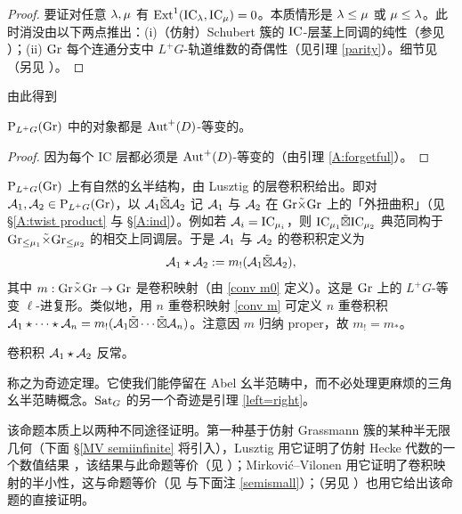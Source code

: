 \begin{proof}
要证对任意 ${\lambda},\mu$ 有 $\operatorname{Ext}^1({\operatorname{IC}}_{\lambda},{\operatorname{IC}}_\mu)=0$。本质情形是 ${\lambda}\leq \mu$ 或 $\mu\leq {\lambda}$。此时消没由以下两点推出：(i)（仿射）Schubert 簇的 $\operatorname{IC}$-层茎上同调的纯性（参见 \cite{KL}）；(ii) ${\operatorname{Gr}}$ 每个连通分支中 $L^+G$-轨道维数的奇偶性（见引理 \ref{parity}）。细节见 \cite[Proposition 1]{Ga}（另见 \cite[Proposition 3.1]{Ri}）。
\end{proof}

由此得到

\begin{cor}
$\operatorname{P}_{L^+G}({\operatorname{Gr}})$ 中的对象都是 ${\operatorname{Aut}}^+(D)$-等变的。
\end{cor}

\begin{proof}
因为每个 IC 层都必须是 ${\operatorname{Aut}}^+(D)$-等变的（由引理 \ref{A:forgetful}）。
\end{proof}

$\operatorname{P}_{L^+G}({\operatorname{Gr}})$ 上有自然的幺半结构，由 Lusztig 的层卷积积给出。即对 ${\mathcal A}_1,{\mathcal A}_2\in \operatorname{P}_{L^+G}({\operatorname{Gr}})$，以 ${\mathcal A}_1\tilde\boxtimes{\mathcal A}_2$ 记 ${\mathcal A}_1$ 与 ${\mathcal A}_2$ 在 ${\operatorname{Gr}}\tilde\times{\operatorname{Gr}}$ 上的「外扭曲积」（见 \S\ref{A:twist product} 与 \S\ref{A:ind}）。例如若 ${\mathcal A}_i={\operatorname{IC}}_{\mu_i}$，则 ${\operatorname{IC}}_{\mu_1}\tilde\boxtimes{\operatorname{IC}}_{\mu_2}$ 典范同构于 ${\operatorname{Gr}}_{\leq \mu_1}\tilde\times{\operatorname{Gr}}_{\leq\mu_2}$ 的相交上同调层。于是 ${\mathcal A}_1$ 与 ${\mathcal A}_2$ 的卷积积定义为
\begin{equation}\label{Lus conv}
{\mathcal A}_1\star{\mathcal A}_2:=m_!({\mathcal A}_1\tilde\boxtimes{\mathcal A}_2),
\end{equation}
其中 $m:{\operatorname{Gr}}\tilde\times{\operatorname{Gr}}\to {\operatorname{Gr}}$ 是卷积映射（由 \eqref{conv m0} 定义）。这是 ${\operatorname{Gr}}$ 上的 $L^+G$-等变 $\ell$-进复形。类似地，用 $n$ 重卷积映射 \eqref{conv m} 可定义 $n$ 重卷积积 ${\mathcal A}_1\star\cdots\star{\mathcal A}_n=m_!({\mathcal A}_1\tilde\boxtimes\cdots\tilde\boxtimes{\mathcal A}_n)$。注意因 $m$ 归纳 proper，故 $m_!=m_*$。

\begin{prop}\label{conv prod}
卷积积 ${\mathcal A}_1\star{\mathcal A}_2$ 反常。
\end{prop}

\cite{BD} 称之为奇迹定理。它使我们能停留在 Abel 幺半范畴中，而不必处理更麻烦的三角幺半范畴概念。${\operatorname{Sat}}_G$ 的另一个奇迹是引理 \ref{left=right}。

该命题本质上以两种不同途径证明。第一种基于仿射 Grassmann 簇的某种半无限几何（下面 \S\ref{MV semiinfinite} 将引入），Lusztig 用它证明了仿射 Hecke 代数的一个数值结果 \cite{Lu}，该结果与此命题等价（见 \cite[Proposition 2.2.1]{Gi1}）；Mirkovi\'c--Vilonen 用它证明了卷积映射的半小性，这与命题等价（见 \cite[Lemma 4.3, 4.4]{MV} 与下面注 \ref{semismall}）；\cite[Corollary 9.7]{NP}（另见 \cite[\S\ 2.2]{Z14}）也用它给出该命题的直接证明。

